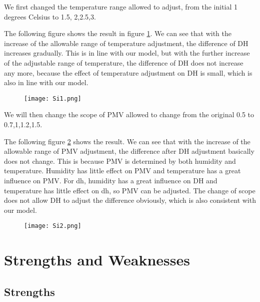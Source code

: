 \documentclass{mcmthesis}
\begin{document}
		We first changed the temperature range allowed to adjust, from the initial 1 degrees Celsius to 1.5, 2,2.5,3.
		
		The following figure shows the result in figure \ref{fig:s1}. We can see that with the increase of the allowable range of temperature adjustment, the difference of DH increases gradually. This is in line with our model, but with the further increase of the adjustable range of temperature, the difference of DH does not increase any more, because the effect of temperature adjustment on DH is small, which is also in line with our model.
		
		\begin{figure}[htbp]
			\small
			\centering
			\texttt{[image: Si1.png]}
			\label{fig:s1}
		\end{figure}
		
		We will then change the scope of PMV allowed to change from the original 0.5 to 0.7,1,1.2,1.5.
		
		The following figure \ref{fig:s2} shows the result. We can see that with the increase of the allowable range of PMV adjustment, the difference after DH adjustment basically does not change. This is because PMV is determined by both humidity and temperature. Humidity has little effect on PMV and temperature has a great influence on PMV. For dh, humidity has a great influence on DH and temperature has little effect on dh, so PMV can be adjusted. The change of scope does not allow DH to adjust the difference obviously, which is also consistent with our model. 
		
		\begin{figure}[htbp]
			\small
			\centering
			\texttt{[image: Si2.png]}
			\label{fig:s2}
		\end{figure}
		
		
	

	
	\section{Strengths and Weaknesses}
	
		\subsection{Strengths}
		
\end{document}

